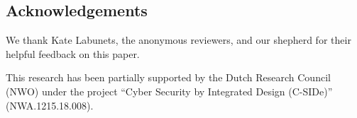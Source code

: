 \subsection*{Acknowledgements}
We thank Kate Labunets, the anonymous reviewers, and our shepherd for their helpful feedback on this paper. 

This research has been partially supported by the Dutch Research Council (NWO) under the project ``Cyber Security by Integrated Design (\mbox{C-SIDe})'' (NWA.1215.18.008).


